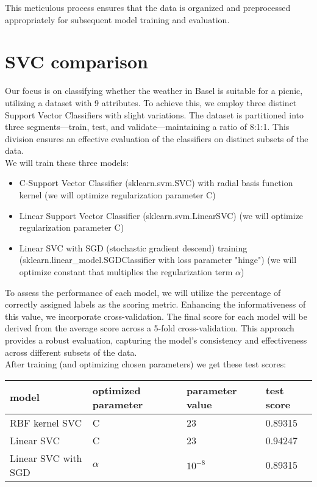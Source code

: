 \documentclass[a4paper]{article}
\begin{document}
	This meticulous process ensures that the data is organized and preprocessed appropriately for subsequent model training and evaluation.
	
	\newpage

	\section{SVC comparison}
	
	Our focus is on classifying whether the weather in Basel is suitable for a picnic, utilizing a dataset with 9 attributes. To achieve this, we employ three distinct Support Vector Classifiers with slight variations. The dataset is partitioned into three segments—train, test, and validate—maintaining a ratio of 8:1:1. This division ensures an effective evaluation of the classifiers on distinct subsets of the data. 
	\\
	
	We will train these three models:
	\begin{itemize}
		\item C-Support Vector Classifier (sklearn.svm.SVC) with radial basis function kernel (we will optimize regularization parameter C)
		\item Linear Support Vector Classifier (sklearn.svm.LinearSVC) (we will optimize regularization parameter C)
		\item Linear SVC with SGD (stochastic gradient descend) training (sklearn.linear\_model.SGDClassifier with loss parameter "hinge") (we will optimize constant that multiplies the regularization term $\alpha$)
	\end{itemize}

	To assess the performance of each model, we will utilize the percentage of correctly assigned labels as the scoring metric. Enhancing the informativeness of this value, we incorporate cross-validation. The final score for each model will be derived from the average score across a 5-fold cross-validation. This approach provides a robust evaluation, capturing the model's consistency and effectiveness across different subsets of the data.
	\\
	
	After training (and optimizing chosen parameters) we get these test scores:
	
		\begin{table}[!h]
			\begin{tabular}{|l|l|l|l|}
				\hline
				model & optimized parameter & parameter value & test score  \\ \hline
				RBF kernel SVC & C & 23 & 0.89315 \\ \hline
				Linear SVC & C & 23 & 0.94247 \\ \hline
				Linear SVC with SGD& $\alpha$ & $10^{-8}$ & 0.89315 \\ \hline
			\end{tabular}
	\end{table} 
\end{document}

